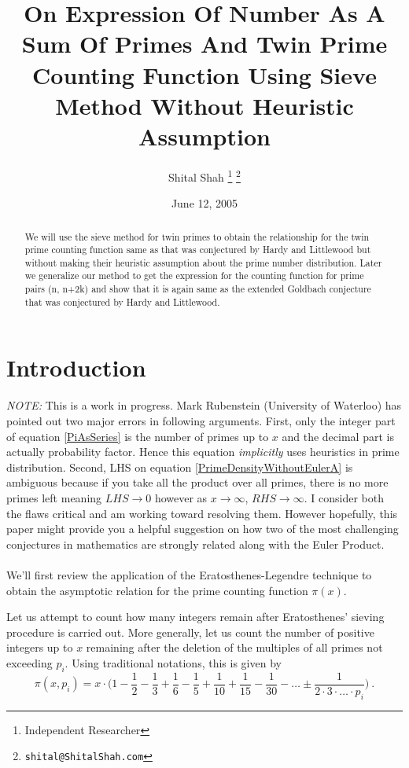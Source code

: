 \documentclass{article}
\numberwithin{equation}{section}
\begin{document}
  

\title{On Expression Of Number As A Sum Of Primes And Twin Prime Counting Function Using Sieve Method Without Heuristic Assumption}
\author{Shital Shah \footnote{Independent Researcher} \footnote{\texttt{shital@ShitalShah.com}}}
\date{June 12, 2005}   
\maketitle
\pagestyle{headings}
\begin{abstract} 
We will use the sieve method for twin primes to obtain the relationship for the twin prime counting function same as that was conjectured by Hardy and Littlewood \cite{HLConjecture} but without making their heuristic assumption about the prime number distribution. Later we generalize our method to get the expression for the counting function for prime pairs (n, n+2k) and show that it is again same as the extended Goldbach conjecture that was conjectured by Hardy and Littlewood.
\end{abstract}

\section{Introduction}
\emph{NOTE: }This is a work in progress. Mark Rubenstein (University of Waterloo) has pointed out two major errors in following arguments. First, only the integer part of equation \eqref{PiAsSeries} is the number of primes up to $x$ and the decimal part is actually probability factor. Hence this equation \textit{implicitly} uses heuristics in prime distribution. Second, LHS on equation \eqref{PrimeDensityWithoutEulerA} is ambiguous because if you take all the product over all primes, there is no more primes left meaning $LHS \to 0$ however as $x \to \infty$, $RHS \to \infty$. I consider both the flaws critical and am working toward resolving them. However hopefully, this paper might provide you a helpful suggestion on how two of the most challenging conjectures in mathematics are strongly related along with the Euler Product.
\\
\\
We'll first review the application of the Eratosthenes-Legendre technique \cite{SieveMethods} to obtain the asymptotic relation for the prime counting function $\pi(x)$.

Let us attempt to count how many integers remain after Eratosthenes' sieving procedure is carried out. More generally, let us count the number of positive integers up to $x$ remaining after the deletion of the multiples
of all primes not exceeding $p_i$. Using traditional notations, this is given by
\begin{equation} 
\pi(x,p_i) = x \cdot \Big(1 - \frac{1}{2} - \frac{1}{3} + \frac{1}{6} - \frac{1}{5} + \frac{1}{10} + \frac{1}{15} - \frac{1}{30} - \ldots \pm \frac{1}{2 \cdot 3 \cdot \ldots \cdot p_i}\Big) \label{PiAsSeries} ~ .
\end{equation}
\end{document}
